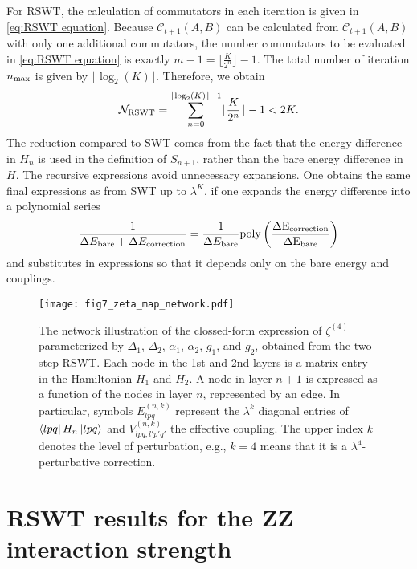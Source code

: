 \documentclass[%
 reprint,
 amsmath,amssymb,
 aps,
pra,
noeprint,
superscriptaddress,
]{revtex4-2}
\begin{document}
For RSWT, the calculation of commutators in each iteration is given in \cref{eq:RSWT equation}.
Because $\mathcal{C}_{t+1}(A,B)$ can be calculated from $\mathcal{C}_{t+1}(A,B)$ with only one additional commutators, the number commutators to be evaluated in \cref{eq:RSWT equation} is exactly $m-1=\lfloor \frac{K}{2^n}\rfloor-1$.
The total number of iteration $n_{\rm{max}}$ is given by $\lfloor \log_2(K)\rfloor$.
Therefore, we obtain
\begin{equation}
    \mathcal{N}_{\rm{RSWT}} = \sum_{n=0}^{\lfloor \log_2(K)\rfloor-1} \lfloor \frac{K}{2^n}\rfloor - 1 < 2K
    .
\end{equation}
The reduction compared to SWT comes from the fact that the energy difference in $H_n$ is used in the definition of $S_{n+1}$, rather than the bare energy difference in $H$. The recursive expressions avoid unnecessary expansions.
One obtains the same final expressions as from SWT up to $\lambda^K$,
if one expands the energy difference into a polynomial series
\begin{equation}
    \frac{1}{
        \Delta E_{\rm{bare}} + \Delta E_{\rm{correction}}
    }
    = 
    \frac{1}{\Delta E_{\rm{bare}}}
    \rm{poly}
    \left(
        \frac{
            \Delta E_{\rm{correction}}
        }{
            \Delta E_{\rm{bare}}
        }
    \right)
\end{equation}
and substitutes in expressions so that it depends only on the bare energy and couplings.


\begin{figure}
	\centering
    \texttt{[image: fig7\_zeta\_map\_network.pdf]}
	\caption{The network illustration of the clossed-form expression of $\zeta^{(4)}$ parameterized by $\Delta_1$, $\Delta_2$, $\alpha_1$, $\alpha_2$, $g_1$, and $g_2$, obtained from the two-step RSWT.
    Each node in the 1st and 2nd layers is a matrix entry in the Hamiltonian $H_1$ and $H_2$.
    A node in layer $n+1$ is expressed as a function of the nodes in layer $n$, represented by an edge. 
    In particular, symbols $E^{(n,k)}_{lpq}$ represent the $\lambda^k$ diagonal entries of $\bra{lpq} H_n\ket{lpq}$ and $V_{lpq,l'p'q'}^{(n,k)}$ the effective coupling.
    The upper index $k$ denotes the level of perturbation, e.g., $k=4$ means that it is a $\lambda^4$-perturbative correction.
    }
	\label{fig:recursive tree for zeta4}
\end{figure}

\section{RSWT results for the ZZ interaction strength}
\label{sec:RSWT quasi-disq detail result}
\end{document}
